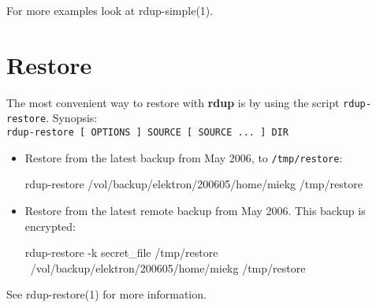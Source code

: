 \documentclass[a4paper, openany]{atroff}
\newcommand{\rdup}{\textbf{rdup}}
\newcommand{\cmd}[1]{\texttt{#1}}
\newcommand{\path}[1]{\texttt{#1}}
\begin{document}
\begin{atblock}
For more examples look at rdup-simple(1).
\end{atblock}

\section*{Restore}
The most convenient way to restore with \rdup{} is by using
the script \cmd{rdup-restore}. Synopsis:\\
\cmd{rdup-restore [ OPTIONS ] SOURCE [ SOURCE ... ] DIR}
\begin{itemize}
\item
Restore from the latest backup from May 2006, to \path{/tmp/restore}:
\begin{display}
rdup-restore /vol/backup/elektron/200605/home/miekg /tmp/restore
\end{display}
\item
Restore from the latest remote backup from May 2006. This backup
is encrypted:\\
\begin{display}
rdup-restore -k secret\_file /tmp/restore \
    /vol/backup/elektron/200605/home/miekg /tmp/restore
\end{display}
\end{itemize}

\begin{atblock}
See rdup-restore(1) for more information.
\end{atblock}
\end{document}
